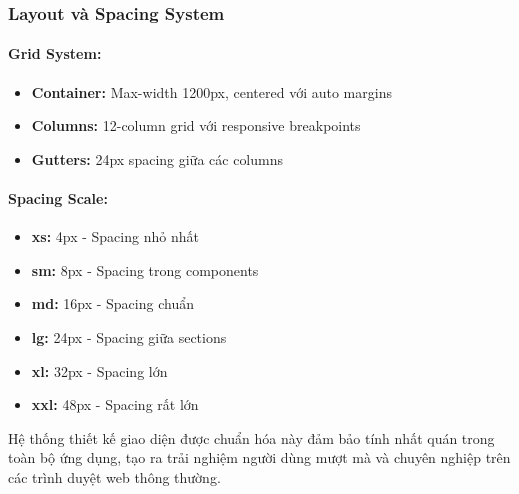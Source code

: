 \subsubsection{Layout và Spacing System}

\paragraph{Grid System:}
\begin{itemize}
    \item \textbf{Container:} Max-width 1200px, centered với auto margins
    \item \textbf{Columns:} 12-column grid với responsive breakpoints
    \item \textbf{Gutters:} 24px spacing giữa các columns
\end{itemize}

\paragraph{Spacing Scale:}
\begin{itemize}
    \item \textbf{xs:} 4px - Spacing nhỏ nhất
    \item \textbf{sm:} 8px - Spacing trong components
    \item \textbf{md:} 16px - Spacing chuẩn
    \item \textbf{lg:} 24px - Spacing giữa sections
    \item \textbf{xl:} 32px - Spacing lớn
    \item \textbf{xxl:} 48px - Spacing rất lớn
\end{itemize}

Hệ thống thiết kế giao diện được chuẩn hóa này đảm bảo tính nhất quán trong toàn bộ ứng dụng, tạo ra trải nghiệm người dùng mượt mà và chuyên nghiệp trên các trình duyệt web thông thường. 